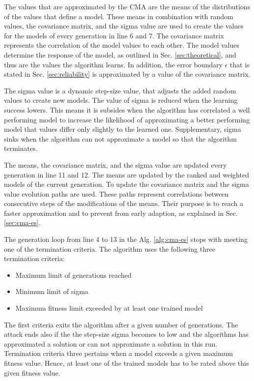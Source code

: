 The values that are approximated by the \ac{CMA} are the means of the distributions of the values that define a model.
These means in combination with random values, the covariance matrix, and the sigma value are used to create the values for the models of every generation in line 6 and 7. %
The covariance matrix represents the correlation of the model values to each other.
The model values determine the response of the \apuf model, as outlined in Sec. \ref{sec:theoretical}, and thus are the values the algorithm learns.
In addition, the error boundary $\epsilon$ that is stated in Sec. \ref{sec:reliability} is approximated by a value of the covariance matrix.

The sigma value is a dynamic step-size value, that adjusts the added random values to create new models.
The value of sigma is reduced when the learning success lowers.
This means it is subsides when the algorithm has correlated a well performing model to increase the likelihood of approximating a better performing model that values differ only slightly to the learned one. %
Supplementary, sigma sinks when the algorithm can not approximate a model so that the algorithm terminates.

The means, the covariance matrix, and the sigma value are updated every generation in line 11 and 12.
The means are updated by the ranked and weighted models of the current generation. %
To update the covariance matrix and the sigma value evolution paths are used.
These paths represent correlations between consecutive steps of the modifications of the means. 
Their purpose is to reach a faster approximation and to prevent from early adaption, as explained in Sec. \ref{sec:cma-es}.

The generation loop from line 4 to 13 in the Alg. \ref{alg:cma-es} stops with meeting one of the termination criteria.
The algorithm uses the following three termination criteria:

\begin{itemize}
\item Maximum limit of generations reached
\item Minimum limit of sigma
\item Maximum fitness limit exceeded by at least one trained model
\end{itemize}

The first criteria exits the algorithm after a given number of generations.
The attack ends also if the the step-size sigma becomes to low and the algorithms has approximated a solution or can not approximate a solution in this run. %
Termination criteria three pertains when a model exceeds a given maximum fitness value.
Hence, at least one of the trained models has to be rated above this given fitness value.

